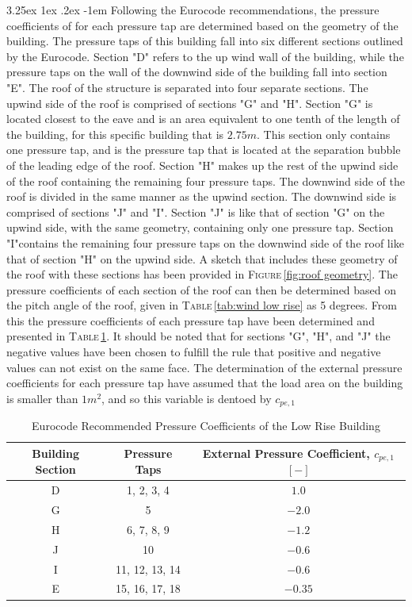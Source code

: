 \documentclass[11pt,a4paper,titlepage]{report}
\makeatletter
\renewcommand\paragraph{\@startsection{paragraph}{5}{\z@}%
  {3.25ex \@plus1ex \@minus.2ex}%
  {-1em}%
  {\normalfont\normalsize\bfseries}}
\makeatother
\begin{document}
\paragraph{}Following the Eurocode recommendations, the pressure coefficients of for each pressure tap are determined based on the geometry of the building. The pressure taps of this building fall into six different sections outlined by the Eurocode. Section "D" refers to the up wind wall of the building, while the pressure taps on the wall of the downwind side of the building fall into section "E". The roof of the structure is separated into four separate sections.   The upwind side of the roof is comprised of sections "G" and "H". Section "G" is located closest to the eave and is an area equivalent to one tenth of the length of the building, for this specific building that is $2.75m$. This section only contains one pressure tap, and is the pressure tap that is located at the separation bubble of the leading edge of the roof. Section "H" makes up the rest of the upwind side of the roof containing the remaining four pressure taps. The downwind side of the roof is divided in the same manner as the upwind section. The downwind side is comprised of sections "J" and "I". Section "J" is like that of section "G" on the upwind side, with the same geometry, containing only one pressure tap. Section "I"contains the remaining four pressure taps on the downwind side of the roof like that of section "H" on the upwind side. A sketch that includes these geometry of the roof with these sections has been provided in \textsc{Figure}\,\ref{fig:roof geometry}. The pressure coefficients of each section of the roof can then be determined based on the pitch angle of the roof, given in \textsc{Table}\,\ref{tab:wind low rise} as 5 degrees. From this the pressure coefficients of each pressure tap have been determined and presented in \textsc{Table}\,\ref{tab:presure coefficients EC}. It should be noted that for sections "G", "H", and "J" the negative values have been chosen to fulfill the rule that positive and negative values can not exist on the same face. The determination of the external pressure coefficients for each pressure tap have assumed that the load area on the building is smaller than $1m^2$, and so this variable is dentoed by $c_{pe,1}$
\begin{table}[h]
    \centering
    \begin{tabular}{c|c|c}
         Building Section & Pressure Taps & External Pressure Coefficient, $c_{pe,1}$ $[-]$\\
         \hline
         D & 1, 2, 3, 4 & $1.0$ \\
         G & 5 & $-2.0$ \\
         H & 6, 7, 8, 9 & $-1.2$ \\
         J & 10 & $-0.6$ \\
         I & 11, 12, 13, 14 & $-0.6$ \\
         E & 15, 16, 17, 18 & $-0.35$ \\
    \end{tabular}
    \caption{Eurocode Recommended Pressure Coefficients of the Low Rise Building}
    \label{tab:presure coefficients EC}
\end{table}
\end{document}
